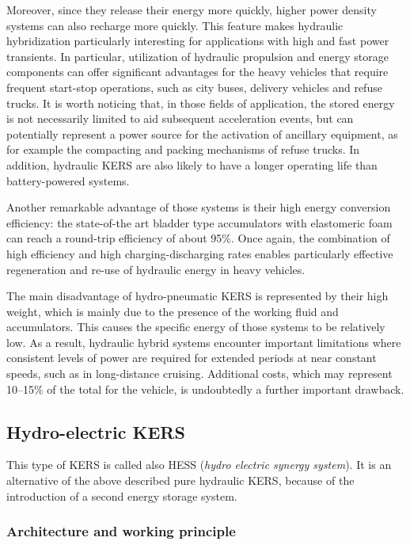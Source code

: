 \documentclass[11pt]{article}
\begin{document}
Moreover, since they release their energy more quickly, higher power density systems can also recharge more quickly. This feature makes hydraulic hybridization particularly interesting for applications with high and fast power transients. In particular, utilization of hydraulic propulsion and energy storage components can offer significant advantages for the heavy vehicles that require frequent start-stop operations, such as city buses, delivery vehicles and refuse trucks. It is worth noticing that, in those fields of application, the stored energy is not necessarily limited to aid subsequent acceleration events, but can potentially represent a power source for the activation of ancillary equipment, as for example the compacting and packing mechanisms of refuse trucks. In addition, hydraulic KERS are also likely to have a longer operating life than battery-powered systems.  

Another remarkable advantage of those systems is their high energy conversion efficiency: the state-of-the art bladder type accumulators with elastomeric foam can reach a round-trip efficiency of about 95\%. Once again, the combination of high efficiency and high charging-discharging rates enables particularly effective regeneration and re-use of hydraulic energy in heavy vehicles.

The main disadvantage of hydro-pneumatic KERS is represented by their high weight, which is mainly due to the presence of the working fluid and accumulators. This causes the specific energy of those systems to be relatively low. As a result, hydraulic hybrid systems encounter important limitations where consistent levels of power are required for extended periods at near constant speeds, such as in long-distance cruising.
Additional costs, which may represent 10–15\% of the total for the vehicle, is undoubtedly a further important drawback.

\subsection{Hydro-electric KERS}

This type of KERS is called also HESS (\textit{hydro electric synergy system}). It is an alternative of the above described pure hydraulic KERS, because of the introduction of a second energy storage system.

\subsubsection{Architecture and working principle}
\end{document}
